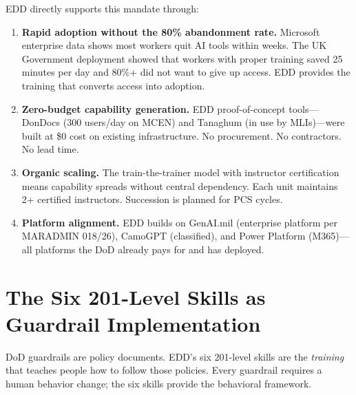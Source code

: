 \documentclass[11pt,letterpaper]{article}
\begin{document}
\medskip

EDD directly supports this mandate through:

\begin{enumerate}
  \item \textbf{Rapid adoption without the 80\% abandonment rate.}
  Microsoft enterprise data shows most workers quit AI tools within weeks.
  The UK Government deployment showed that workers with proper training saved 25 minutes per day and 80\%+ did not want to give up access.
  EDD provides the training that converts access into adoption.

  \item \textbf{Zero-budget capability generation.}
  EDD proof-of-concept tools---DonDocs (300 users/day on MCEN) and Tanaghum (in use by MLIs)---were built at \$0 cost on existing infrastructure.
  No procurement. No contractors. No lead time.

  \item \textbf{Organic scaling.}
  The train-the-trainer model with instructor certification means capability spreads without central dependency.
  Each unit maintains 2+ certified instructors.
  Succession is planned for PCS cycles.

  \item \textbf{Platform alignment.}
  EDD builds on GenAI.mil (enterprise platform per MARADMIN 018/26), CamoGPT (classified), and Power Platform (M365)---all platforms the DoD already pays for and has deployed.
\end{enumerate}

\section{The Six 201-Level Skills as Guardrail Implementation}
\label{sec:skills}

DoD guardrails are policy documents.
EDD's six 201-level skills are the \emph{training} that teaches people how to follow those policies.
Every guardrail requires a human behavior change; the six skills provide the behavioral framework.

\medskip
\end{document}
